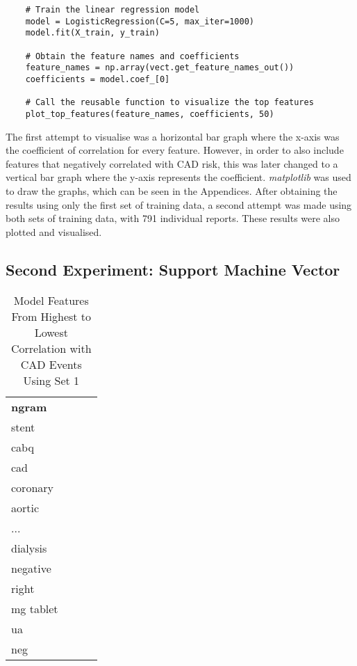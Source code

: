 \documentclass[a4paper,12pt]{article}
\begin{document}
\begin{verbatim}
    # Train the linear regression model
    model = LogisticRegression(C=5, max_iter=1000)
    model.fit(X_train, y_train)
    
    # Obtain the feature names and coefficients
    feature_names = np.array(vect.get_feature_names_out())
    coefficients = model.coef_[0]

    # Call the reusable function to visualize the top features
    plot_top_features(feature_names, coefficients, 50)
\end{verbatim}

The first attempt to visualise was a horizontal bar graph where the x-axis
was the coefficient of correlation for every feature.
However, in order to also include features that negatively correlated with
CAD risk, this was later changed to a vertical bar graph where the y-axis
represents the coefficient.
\textit{matplotlib} was used to draw the graphs, which can be seen in the
Appendices.
After obtaining the results using only the first set of training data,
a second attempt was made using both sets of training data, with 791
individual reports.
These results were also plotted and visualised.

\subsection{Second Experiment: Support Machine Vector}

\begin{table}[h]
\centering
\begin{tabular}{lccc}
    \toprule
    \textbf{n\-gram} \\
    stent \\
    cabq \\
    cad \\
    coronary \\
    aortic \\
    ...\\
    dialysis \\
    negative \\
    right \\
    mg tablet \\
    ua \\
    neg \\
    \midrule
    \bottomrule
\end{tabular}
\caption{Model Features From Highest to Lowest Correlation with CAD Events Using Set 1}
\label{tab:top_features_event_50}
\end{table}
\end{document}
